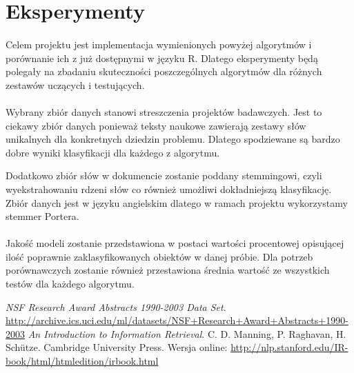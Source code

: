 \documentclass[a4paper,12pt]{article}
\begin{document}
\section{Eksperymenty}
\paragraph{}
Celem projektu jest implementacja wymienionych powyżej algorytmów i porównanie ich z już dostępnymi w języku R. Dlatego eksperymenty będą polegały na zbadaniu skuteczności poszczególnych algorytmów dla różnych zestawów uczących i testujących. 


\paragraph{}
Wybrany zbiór danych stanowi streszczenia projektów badawczych. Jest to
ciekawy zbiór danych ponieważ teksty naukowe zawierają zestawy słów
unikalnych dla konkretnych dziedzin problemu. Dlatego spodziewane są bardzo
dobre wyniki klasyfikacji dla każdego z algorytmu. 

Dodatkowo zbiór słów w dokumencie zostanie poddany stemmingowi, czyli
wyekstrahowaniu rdzeni słów co również umożliwi dokładniejszą klasyfikację.
Zbiór danych jest w języku angielskim dlatego w ramach projektu wykorzystamy
stemmer Portera.  


\paragraph{}
Jakość modeli zostanie przedstawiona w postaci wartości procentowej
opisującej ilość poprawnie zaklasyfikowanych obiektów w danej próbie. Dla
potrzeb porównawczych zostanie również przestawiona średnia wartość ze
wszystkich testów dla każdego algorytmu. 


\begin{thebibliography}{9}

   \emph{NSF Research Award Abstracts 1990-2003 Data Set}.
   \url{http://archive.ics.uci.edu/ml/datasets/NSF+Research+Award+Abstracts+1990-2003}
	\emph{An Introduction to Information Retrieval}. 
	C. D. Manning, P. Raghavan, H. Sch\"utze.
	Cambridge University Press.
	Wersja online: \url{http://nlp.stanford.edu/IR-book/html/htmledition/irbook.html}

\end{thebibliography}
\end{document}
